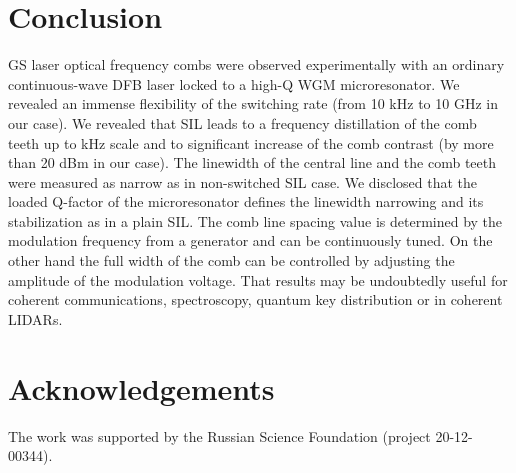 \documentclass[a4paper, amsfonts, amssymb, amsmath, reprint, showkeys, nofootinbib, twoside,longbibliography, aps]{revtex4-1}
\begin{document}
\section {Conclusion}
GS laser optical frequency combs were observed experimentally with an ordinary continuous-wave DFB laser locked to a high-Q WGM microresonator. We revealed an immense flexibility of the switching rate (from 10 kHz to 10 GHz in our case).  We revealed that SIL leads to a frequency distillation of the comb teeth up to kHz scale and to significant increase of the comb contrast (by more than 20 dBm in our case). The linewidth of the central line and the comb teeth were measured as narrow as in non-switched SIL case. We disclosed that the loaded Q-factor of the microresonator defines the linewidth narrowing and its stabilization as in a plain SIL. The comb line spacing value is determined by the modulation frequency from a generator and can be continuously tuned. On the other hand the full width of the comb can be controlled by adjusting the amplitude of the modulation voltage. That results may be undoubtedly useful for coherent communications, spectroscopy, quantum key distribution or in coherent LIDARs. 


\section*{Acknowledgements}
The work was supported by the Russian Science Foundation (project 20-12-00344).

\newpage
\eject


\end{document}
